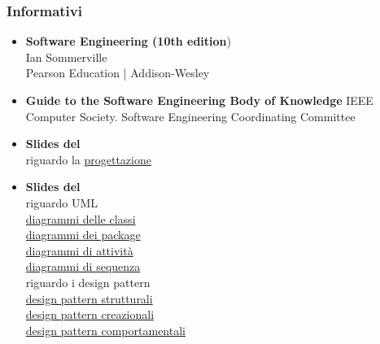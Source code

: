 \subsubsection{Informativi}
\begin{itemize}
	\item \textbf{Software Engineering (10th edition}) \\
	Ian Sommerville \\
	Pearson Education | Addison-Wesley
	\item \textbf{Guide to the Software Engineering Body of Knowledge}
	IEEE Computer Society. Software Engineering Coordinating Committee
	\item \textbf{Slides del \COMMITTENTE} \\ riguardo la  \href{http://www.math.unipd.it/~tullio/IS-1/2015/Dispense/L07.pdf}{progettazione}
	\item \textbf{Slides del \CARDIN} \\ riguardo UML \\ 	
	\href{http://www.math.unipd.it/~tullio/IS-1/2015/Dispense/E03.pdf}{diagrammi delle classi} \\
	\href{http://www.math.unipd.it/~tullio/IS-1/2015/Dispense/E04.pdf}{diagrammi dei package} \\
	\href{http://www.math.unipd.it/~tullio/IS-1/2015/Dispense/E06.pdf}{diagrammi di attività} \\
	\href{http://www.math.unipd.it/~tullio/IS-1/2015/Dispense/E05.pdf}{diagrammi di sequenza} \\
	riguardo i design pattern \\
	\href{http://www.math.unipd.it/~tullio/IS-1/2015/Dispense/E07.pdf}{design pattern strutturali} \\
	\href{http://www.math.unipd.it/~tullio/IS-1/2015/Dispense/E08.pdf}{design pattern creazionali} \\ 
	\href{http://www.math.unipd.it/~tullio/IS-1/2015/Dispense/E09.pdf}{design pattern comportamentali}
	
	
\end{itemize}
